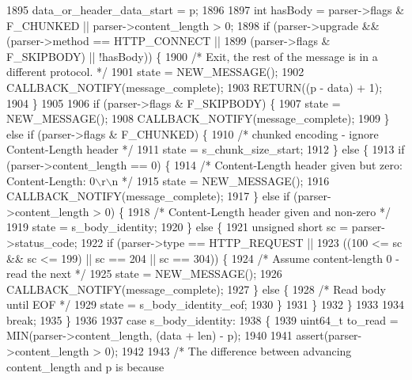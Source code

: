 \begin{DoxyCode}
1895         data\_or\_header\_data\_start = p;
1896 
1897         \textcolor{keywordtype}{int} hasBody = parser->flags & F_CHUNKED || parser->content_length > 0;
1898         \textcolor{keywordflow}{if} (parser->upgrade && (parser->method == HTTP_CONNECT ||
1899                                 (parser->flags & F_SKIPBODY) || !hasBody)) \{
1900           \textcolor{comment}{/* Exit, the rest of the message is in a different protocol. */}
1901           state = NEW_MESSAGE();
1902           CALLBACK_NOTIFY(message\_complete);
1903           RETURN((p - data) + 1);
1904         \}
1905 
1906         \textcolor{keywordflow}{if} (parser->flags & F_SKIPBODY) \{
1907           state = NEW_MESSAGE();
1908           CALLBACK_NOTIFY(message\_complete);
1909         \} \textcolor{keywordflow}{else} \textcolor{keywordflow}{if} (parser->flags & F_CHUNKED) \{
1910           \textcolor{comment}{/* chunked encoding - ignore Content-Length header */}
1911           state = s_chunk_size_start;
1912         \} \textcolor{keywordflow}{else} \{
1913           \textcolor{keywordflow}{if} (parser->content_length == 0) \{
1914             \textcolor{comment}{/* Content-Length header given but zero: Content-Length: 0\(\backslash\)r\(\backslash\)n */}
1915             state = NEW_MESSAGE();
1916             CALLBACK_NOTIFY(message\_complete);
1917           \} \textcolor{keywordflow}{else} \textcolor{keywordflow}{if} (parser->content_length > 0) \{
1918             \textcolor{comment}{/* Content-Length header given and non-zero */}
1919             state = s_body_identity;
1920           \} \textcolor{keywordflow}{else} \{
1921             \textcolor{keywordtype}{unsigned} \textcolor{keywordtype}{short} sc = parser->status_code;
1922             \textcolor{keywordflow}{if} (parser->type == HTTP_REQUEST ||
1923                 ((100 <= sc && sc <= 199) || sc == 204 || sc == 304)) \{
1924               \textcolor{comment}{/* Assume content-length 0 - read the next */}
1925               state = NEW_MESSAGE();
1926               CALLBACK_NOTIFY(message\_complete);
1927             \} \textcolor{keywordflow}{else} \{
1928               \textcolor{comment}{/* Read body until EOF */}
1929               state = s_body_identity_eof;
1930             \}
1931           \}
1932         \}
1933 
1934         \textcolor{keywordflow}{break};
1935       \}
1936 
1937       \textcolor{keywordflow}{case} s_body_identity:
1938       \{
1939         uint64\_t to\_read = MIN(parser->content_length, (data + len) - p);
1940 
1941         assert(parser->content_length > 0);
1942 
1943         \textcolor{comment}{/* The difference between advancing content\_length and p is because}

\end{DoxyCode}
